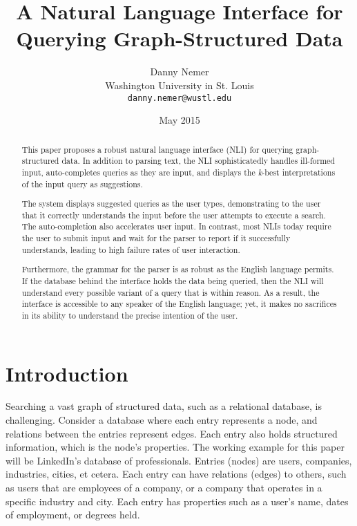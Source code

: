 \documentclass{article}
\begin{document}
\title{A Natural Language Interface for Querying
Graph-Structured Data}
\author{Danny Nemer\\
Washington University in St. Louis\\
\texttt{danny.nemer@wustl.edu}}
\date{May 2015}
\maketitle


\begin{abstract}
This paper proposes a robust natural language interface (NLI) for querying graph-structured data. In addition to parsing text, the NLI sophisticatedly handles ill-formed input, auto-completes queries as they are input, and displays the \textit{k}-best interpretations of the input query as suggestions.

The system displays suggested queries as the user types, demonstrating to the user that it correctly understands the input before the user attempts to execute a search. The auto-completion also accelerates user input. In contrast, most NLIs today require the user to submit input and wait for the parser to report if it successfully understands, leading to high failure rates of user interaction.

Furthermore, the grammar for the parser is as robust as the English language permits. If the database behind the interface holds the data being queried, then the NLI will understand every possible variant of a query that is within reason. As a result, the interface is accessible to any speaker of the English language; yet, it makes no sacrifices in its ability to understand the precise intention of the user.
\end{abstract}


\section{Introduction}
Searching a vast graph of structured data, such as a relational database, is challenging. Consider a database where each entry represents a node, and relations between the entries represent edges. Each entry also holds structured information, which is the node's properties. The working example for this paper will be LinkedIn's database of professionals. Entries (nodes) are users, companies, industries, cities, et cetera. Each entry can have relations (edges) to others, such as users that are employees of a company, or a company that operates in a specific industry and city. Each entry has properties such as a user's name, dates of employment, or degrees held.
\end{document}
